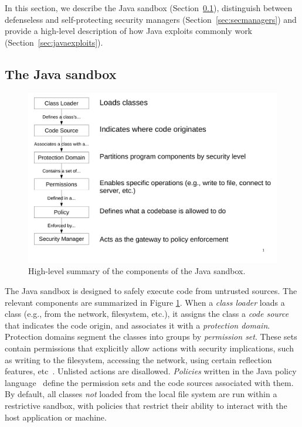 \documentclass{sig-alternate}
\begin{document}
In this section, we describe the Java sandbox
(Section~\ref{sec:sandbox}), distinguish between defenseless and self-protecting
security managers (Section~\ref{sec:secmanagers}) and provide a high-level
description of how Java exploits commonly work
(Section~\ref{sec:javaexploits}). 

\subsection{The Java sandbox}
\label{sec:sandbox}

\begin{figure}
\includegraphics[width=\columnwidth]{sandbox_overview}
\caption{High-level summary of the components of the Java 
\label{fig:Sandbox-high-level-summary}
sandbox.}
\end{figure}

The Java sandbox is designed to safely execute code from untrusted
sources. 
The relevant components are summarized in Figure
\ref{fig:Sandbox-high-level-summary}. 
When a \textit{class loader} loads a class (e.g., from
the network, filesystem, etc.), it assigns the class a \textit{code source} that
indicates the code origin, and associates it with a \textit{protection
  domain}. Protection domains segment the classes into groups by
\textit{permission set}. These sets
contain permissions that explicitly allow actions with security
implications, such as writing to the filesystem, accessing the network, using
certain reflection features, etc~\cite{_permissions_2014}.  Unlisted actions are disallowed.
\emph{Policies} written in the Java policy
language~\cite{_java_policy_language} define the permission sets and the code
sources associated with them. 
By default, all classes \emph{not} loaded from the local file system are run
within a restrictive sandbox, with policies that restrict their ability to
interact with the host application or machine. 
\end{document}
